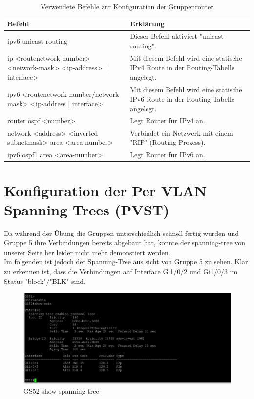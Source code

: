 \documentclass{article}
\begin{document}
\begin{table}[htbp]
    \centering
    \begin{tabularx}{\textwidth}{|X|X|}
        \toprule
        \textbf{Befehl} & \textbf{Erklärung} \\
        \midrule
        ipv6 unicast-routing & Dieser Befehl aktiviert "unicast-routing".\\
        ip <routenetwork-number> <network-mask> <ip-address> | interface> & Mit diesem Befehl wird eine statische IPv4 Route in der Routing-Tabelle angelegt.\\
        \hline
        ipv6 <routenetwork-number/network-mask> <ip-address | interface> & Mit diesem Befehl wird eine statische IPv6 Route in der Routing-Tabelle angelegt.\\
        \hline
        router ospf <number> & Legt Router für IPv4 an.\\
        \hline
        network <address> <inverted subnetmask> area <area-number> & Verbindet ein Netzwerk mit einem "RIP" (Routing Prozess).\\
        \hline
        ipv6 ospf1 area <area-number> & Legt Router für IPv6 an.\\
        \bottomrule
    \end{tabularx}
    \caption{Verwendete Befehle zur Konfiguration der Gruppenrouter}
    \label{tab:commands}
\end{table}


\section{Konfiguration der Per VLAN Spanning Trees (PVST)}
Da während der Übung die Gruppen unterschiedlich schnell fertig wurden und Gruppe 5 ihre Verbindungen bereits abgebaut hat, konnte der spanning-tree von unserer Seite her leider nicht mehr demonstiert werden.\\
Im folgenden ist jedoch der Spanning-Tree aus sicht von Gruppe 5 zu sehen. Klar zu erkennen ist, dass die Verbindungen auf Interface Gi1/0/2 und Gi1/0/3 im Status "block"/"BLK" sind.

\begin{figure}[!htp]
  \centering
  \begin{minipage}[b]{0.90\textwidth}
    \includegraphics[width=\textwidth]{Arbeitsergebnisse/gs52/gs52_span.jpeg}
    \caption{GS52 show spanning-tree}
  \end{minipage}
\end{figure}
\end{document}
